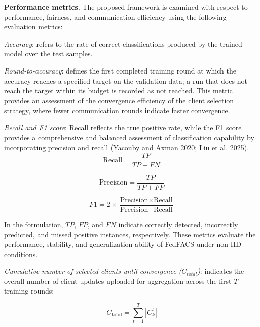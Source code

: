 \documentclass[pdflatex,sn-mathphys-num,oneside]{sn-jnl}%
\theoremstyle{thmstyleone}%
\theoremstyle{thmstyletwo}%
\theoremstyle{thmstylethree}%
\begin{document}
\textbf{Performance metrics}. The proposed framework is examined with respect to performance, fairness, and communication efficiency using the following evaluation metrics:

\textit{Accuracy}: refers to the rate of correct classifications produced by the trained model over the test samples.

\textit{Round-to-accuracy}: defines the first completed training round at which the accuracy reaches a specified target on the validation data; a run that does not reach the target within its budget is recorded as not reached. This metric provides an assessment of the convergence efficiency of the client selection strategy, where fewer communication rounds indicate faster convergence.

\textit{Recall and F1 score}: Recall reflects the true positive rate, while the F1 score provides a comprehensive and balanced assessment of classification capability by incorporating precision and recall (Yacouby and Axman 2020; Liu et al. 2025). 
\begin{equation}
\text{Recall} = \frac{TP}{TP + FN}
\label{eq:recall}
\end{equation}

\begin{equation}
\text{Precision} = \frac{TP}{TP + FP}
\label{eq:precision}
\end{equation}

\begin{equation}
F1 = 2 \times \frac{\text{Precision} \times \text{Recall}}
{\text{Precision} + \text{Recall}}
\label{eq:f1_score}
\end{equation}



In the formulation, $TP$, $FP$, and $FN$ indicate correctly detected, incorrectly predicted, and missed positive instances, respectively. These metrics evaluate the performance, stability, and generalization ability of FedFACS under non-IID conditions.


\textit{Cumulative number of selected clients until convergence  ($C_{total}$)}: indicates the overall number of client updates uploaded for aggregation across the first $T$ training rounds:

\begin{equation}
C_{\text{total}} = \sum_{t=1}^{T} \left|C_k^t\right|
\label{eq:communication}
\end{equation}
\end{document}
